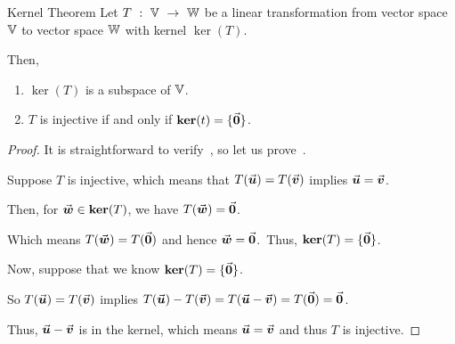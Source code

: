 \documentclass{beamer}
\begin{document}
\begin{frame}
\begin{block}{Kernel Theorem}
Let $T\ :\ \mathbb{V}\ \rightarrow\ \mathbb{W}$ be a linear transformation from vector space $\mathbb{V}$ to vector space $\mathbb{W}$ with kernel $\ker(T)$.

\vspace{2mm}
Then,
\begin{enumerate}
\item\label{kerthm1} $\ker(T)$ is a subspace of $\mathbb{V}$.
\item\label{kerthm2} $T$ is injective if and only if $\operatorname{\textbf{ker}}(t)=\{{\vec{\boldsymbol{0}}}\}$.
\end{enumerate}
\end{block}\pause
\begin{proof}
It is straightforward to verify~, so let us prove~.\pause

\vspace{1mm}
Suppose $T$ is injective, which means that $T({\vec{\boldsymbol{u}}})=T({\vec{\boldsymbol{v}}})$ implies ${\vec{\boldsymbol{u}}}={\vec{\boldsymbol{v}}}$.\pause

\vspace{1mm}
Then, for ${\vec{\boldsymbol{w}}}\in\operatorname{\textbf{ker}}(T)$, we have $T({\vec{\boldsymbol{w}}})={\vec{\boldsymbol{0}}}$.\pause

\vspace{1mm}
Which means $T({\vec{\boldsymbol{w}}})=T({\vec{\boldsymbol{0}}})$ and hence ${\vec{\boldsymbol{w}}}={\vec{\boldsymbol{0}}}$.\pause\ Thus, $\operatorname{\textbf{ker}}(T)=\{{\vec{\boldsymbol{0}}}\}$.\pause

\vspace{1mm}
Now, suppose that we know $\operatorname{\textbf{ker}}(T)=\{{\vec{\boldsymbol{0}}}\}$.\pause

\vspace{1mm}
So $T({\vec{\boldsymbol{u}}})=T({\vec{\boldsymbol{v}}})$ implies $T({\vec{\boldsymbol{u}}})-T({\vec{\boldsymbol{v}}})=T({\vec{\boldsymbol{u}}}-{\vec{\boldsymbol{v}}})=T({\vec{\boldsymbol{0}}})={\vec{\boldsymbol{0}}}$.\pause 

\vspace{1mm}
Thus, ${\vec{\boldsymbol{u}}}-{\vec{\boldsymbol{v}}}$ is in the kernel, which means ${\vec{\boldsymbol{u}}}={\vec{\boldsymbol{v}}}$ and thus $T$ is injective.
\end{proof}
\end{frame}
\end{document}

